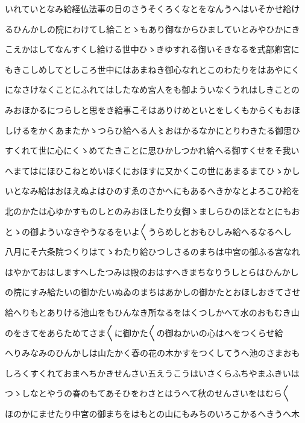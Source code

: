 \documentclass[a4paper,11pt,landscape]{ltjtarticle}
\begin{document}
\par\medskip
いれていとなみ給経仏法事の日のさうそくろくなとをなんうへはいそかせ給け
\par\medskip
るひんかしの院にわけてし給ことゝもあり御なからひましていとみやひかにき
\par\medskip
こえかはしてなんすくし給ける世中ひゝきゆすれる御いそきなるを式部卿宮に
\par\medskip
もきこしめしてとしころ世中にはあまねき御心なれとこのわたりをはあやにく
\par\medskip
になさけなくことにふれてはしたなめ宮人をも御よういなくうれはしきことの
\par\medskip
みおほかるにつらしと思をき給事こそはありけめといとをしくもからくもおほ
\par\medskip
しけるをかくあまたかゝつらひ給へる人〻おほかるなかにとりわきたる御思ひ
\par\medskip
すくれて世に心にくゝめてたきことに思ひかしつかれ給へる御すくせをそ我い
\par\medskip
へまてはにほひこねとめいほくにおほすに又かくこの世にあまるまてひゝかし
\par\medskip
いとなみ給はおほえぬよはひのすゑのさかへにもあるへきかなとよろこひ給を
\par\medskip
北のかたは心ゆかすものしとのみおほしたり女御ゝましらひのほとなとにもお
\par\medskip
とゝの御よういなきやうなるをいよ〱うらめしとおもひしみ給へるなるへし
\par\medskip
八月にそ六条院つくりはてゝわたり給ひつしさるのまちは中宮の御ふる宮なれ
\par\medskip
はやかておはしますへしたつみは殿のおはすへきまちなりうしとらはひんかし
\par\medskip
の院にすみ給たいの御かたいぬゐのまちはあかしの御かたとおほしおきてさせ
\par\medskip
給へりもとありける池山をもひんなき所なるをはくつしかへて水のおもむき山
\par\medskip
のをきてをあらためてさま〱に御かた〱の御ねかいの心はへをつくらせ給
\par\medskip
へりみなみのひんかしは山たかく春の花の木かすをつくしてうへ池のさまおも
\par\medskip
しろくすくれておまへちかきせんさい五えうこうはいさくらふちやまふきいは
\par\medskip
つゝしなとやうの春のもてあそひをわさとはうへて秋のせんさいをはむら〱
\par\medskip
ほのかにませたり中宮の御まちをはもとの山にもみちのいろこかるへきうへ木
\par\medskip
\end{document}
